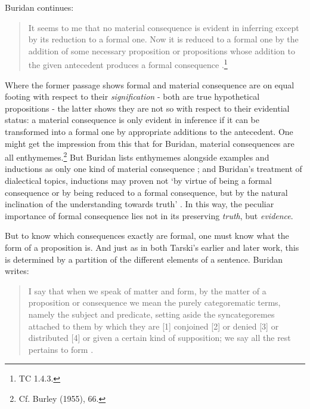 \documentclass[]{article}
\begin{document}
Buridan continues: 
\begin{quote}
It seems to me that no material consequence is evident in inferring except by its reduction to a formal one. Now it is reduced to a formal one by the addition of some necessary proposition or propositions whose addition to the given antecedent produces a formal consequence \cite[TC I. 4, 68]{Buridan2015}.\footnote{TC 1.4.3.}
\end{quote}

Where the former passage shows formal and material consequence are on equal footing with respect to their \textit{signification} - both are true hypothetical propositions - the latter shows they are not so with respect to their evidential status: a material consequence is only evident in inference if it can be transformed into a formal one by appropriate additions to the antecedent. One might get the impression from this that for Buridan, material consequences are all enthymemes.\footnote{Cf. Burley (1955), 66.} But Buridan lists enthymemes alongside examples and inductions as only one kind of material consequence \cite[TC III. 1, 113]{Buridan2015}; and Buridan's treatment of dialectical topics, inductions may proven not `by virtue of being a formal consequence or by being reduced to a formal consequence, but by the natural inclination of the understanding towards truth' \cite[SD 6.1.5]{BuridanLoci}. In this way, the peculiar importance of formal consequence lies not in its preserving \textit{truth}, but \textit{evidence}.

But to know which consequences exactly are formal, one must know what the form of a proposition is. And just as in both Tarski's earlier and later work, this is determined by a partition of the different elements of a sentence. Buridan writes:

\begin{quote}
I say that when we speak of matter and form, by the matter of a proposition or consequence we mean the purely categorematic terms, namely the subject and predicate, setting aside the syncategoremes attached to them by which they are [1] conjoined [2] or denied [3] or distributed [4] or given a certain kind of supposition; we say all the rest pertains to form \cite[TC I. 7, 74]{Buridan2015}.
\end{quote}
\end{document}
